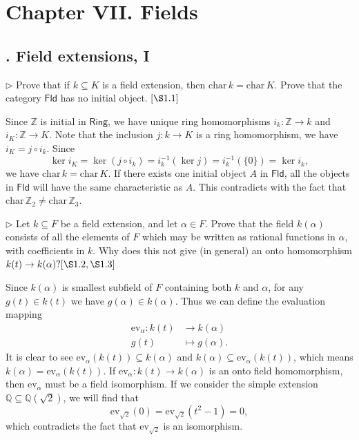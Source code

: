 \documentclass[12pt,letterpaper,boxed]{hmcpset}
\begin{document}
\newpage
\section{Chapter VII.\hspace{0.2em} Fields}
\subsection{. Field extensions, I}
\begin{problem}[1.1]
$\triangleright$ Prove that if $k \subseteq K$ is a field extension, then $\mathrm{char}\,k=\mathrm{char}\,K$. Prove that the category $\mathsf{Fld}$ has no initial object. $[\S 1.1]$
\end{problem}
\begin{solution}
	Since $\mathbb{Z}$ is initial in $\mathsf{Ring}$, we have unique ring homomorphisms $i_k: \mathbb{Z} \rightarrow k$ and $i_K: \mathbb{Z} \rightarrow K$. Note that the inclusion $j:k\rightarrow K$ is a ring homomorphism, we have $i_K=j\circ i_k$. Since
	\[
	\ker i_K=\ker(j\circ i_k)=i_{k}^{-1}(\ker j)=i_{k}^{-1}(\{0\})=\ker i_k,
	\]
	we have $\mathrm{char}\,k=\mathrm{char}\,K$. If there exists one initial object $A$ in $\mathsf{Fld}$, all the objects in $\mathsf{Fld}$ will have the same characteristic as $A$. This contradicts with the fact that $\mathrm{char}\,{\mathbb{Z}}_2 \ne \mathrm{char}\,\mathbb{Z}_3$.
\end{solution}

\begin{problem}[1.3]
$\triangleright$ Let $k \subseteq F$ be a field extension, and let $\alpha \in F .$ Prove that the field $k(\alpha)$ consists of all the elements of $F$ which may be written as rational functions in $\alpha$, with coefficients in $k$. Why does this not give (in general) an onto homomorphism $k(t) \rightarrow k(\alpha) ?[\S 1.2, \S 1.3]$
\end{problem}
\begin{solution}
Since $k(\alpha)$ is smallest subfield of $F$ containing both $k$ and $\alpha$, for any $g(t)\in k(t)$ we have $g(\alpha)\in k(\alpha)$. Thus we can define the evaluation mapping
\begin{align*}
	\mathrm{ev}_{\alpha}:k(t) &\longrightarrow k(\alpha)\\
	g(t)&\longmapsto g(\alpha).
\end{align*}
It is clear to see $\mathrm{ev}_{\alpha}(k(t))\subseteq k(\alpha)$ and $k(\alpha)\subseteq \mathrm{ev}_{\alpha}(k(t))$, which means $k(\alpha)= \mathrm{ev}_{\alpha}(k(t))$.
If $\mathrm{ev}_{\alpha}:k(t) \rightarrow k(\alpha)$ is an onto field homomorphism, then $\mathrm{ev}_{\alpha}$ must be a field isomorphism. If we consider the simple extension $\mathbb{Q}\subseteq\mathbb{Q}(\sqrt{2})$, we will find that  
\[
\mathrm{ev}_{\sqrt{2}}(0)=\mathrm{ev}_{\sqrt{2}}(t^2-1)=0,
\]
which contradicts the fact that $\mathrm{ev}_{\sqrt{2}}$ is an isomorphism.
\end{solution}
\end{document}
